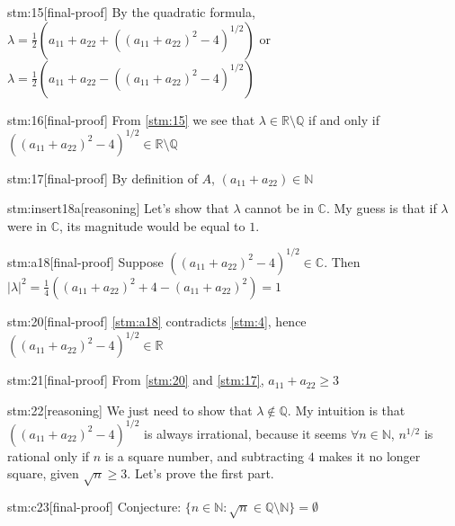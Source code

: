 \documentclass{article}
\begin{document}
\begin{stm}{stm:15}[final-proof]
By the quadratic formula, $\lambda = \frac{1}{2}(a_{11} + a_{22} + ((a_{11} + a_{22})^2 - 4)^{1/2})$ or $\lambda = \frac{1}{2}(a_{11} + a_{22} - ((a_{11} + a_{22})^2 - 4)^{1/2})$
\end{stm}

\begin{stm}{stm:16}[final-proof]
From \ref{stm:15} we see that $\lambda \in \mathbb{R} \setminus \mathbb{Q}$ if and only if $((a_{11} + a_{22})^2 - 4)^{1/2} \in \mathbb{R} \setminus \mathbb{Q}$
\end{stm}

\begin{stm}{stm:17}[final-proof]
By definition of $A$, $(a_{11} + a_{22}) \in \mathbb{N}$
\end{stm}

\begin{stm}{stm:insert18a}[reasoning]
Let's show that $\lambda$ cannot be in $\mathbb{C}$. My guess is that if $\lambda$ were in $\mathbb{C}$, its magnitude would be equal to $1$.
\end{stm}

\begin{stm}{stm:a18}[final-proof]
Suppose $((a_{11} + a_{22})^2 - 4)^{1/2} \in \mathbb{C}$. Then $|\lambda|^2 = \frac{1}{4}((a_{11} + a_{22})^2 + 4 - (a_{11} + a_{22})^2) = 1$
\end{stm}

\begin{stm}{stm:20}[final-proof]
\ref{stm:a18} contradicts \ref{stm:4}, hence $((a_{11} + a_{22})^2 - 4)^{1/2} \in \mathbb{R}$
\end{stm}

\begin{stm}{stm:21}[final-proof]
From \ref{stm:20} and \ref{stm:17}, $a_{11} + a_{22} \geq 3$
\end{stm}

\begin{stm}{stm:22}[reasoning]
We just need to show that $\lambda \notin \mathbb{Q}$. My intuition is that $((a_{11} + a_{22})^2 - 4)^{1/2}$ is always irrational, because it seems $\forall n \in \mathbb{N}$, $n^{1/2}$ is rational only if $n$ is a square number, and subtracting $4$ makes it no longer square, given $\sqrt{n} \ge 3$. Let's prove the first part.
\end{stm}

\begin{stm}{stm:c23}[final-proof]
Conjecture: $\{n \in \mathbb{N} : \sqrt{n} \in \mathbb{Q} \setminus \mathbb{N} \} = \emptyset$
\end{stm}
\end{document}
